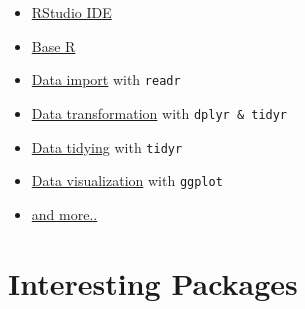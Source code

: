 \documentclass[
]{scrartcl}
\providecommand{\tightlist}{%
  \setlength{\itemsep}{0pt}\setlength{\parskip}{0pt}}
\begin{document}
\begin{itemize}
\tightlist
\item
  \href{https://raw.githubusercontent.com/rstudio/cheatsheets/main/rstudio-ide.pdf}{RStudio IDE}
\item
  \href{https://raw.githubusercontent.com/rstudio/cheatsheets/master/base-r.pdf}{Base R}
\item
  \href{https://raw.githubusercontent.com/rstudio/cheatsheets/main/data-import.pdf}{Data import} with \texttt{readr}
\item
  \href{https://raw.githubusercontent.com/rstudio/cheatsheets/main/data-transformation.pdf}{Data transformation} with \texttt{dplyr\ \&\ tidyr}
\item
  \href{https://raw.githubusercontent.com/rstudio/cheatsheets/master/tidyr.pdf}{Data tidying} with \texttt{tidyr}
\item
  \href{https://raw.githubusercontent.com/rstudio/cheatsheets/main/data-visualization.pdf}{Data visualization} with \texttt{ggplot}
\item
  \href{https://rstudio.com/resources/cheatsheets/}{and more..}
\end{itemize}

\hypertarget{packagelist}{%
\section{Interesting Packages}\label{packagelist}}
\end{document}
